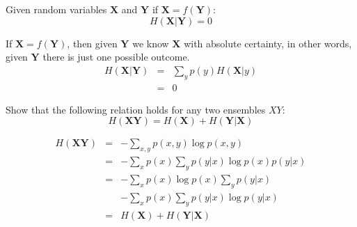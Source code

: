 \begin{exercise}
\label{lem:function}
Given random variables $\mathbf{X}$ and $\mathbf{Y}$ if $\mathbf{X}=f(\mathbf{Y})$: 
\begin{equation*}
H(\mathbf{X}|\mathbf{Y}) = 0
\end{equation*}
\end{exercise}
\begin{solution}
If $\mathbf{X}=f(\mathbf{Y})$, then given $\mathbf{Y}$ we know $\mathbf{X}$ with absolute certainty, in other words, given $\mathbf{Y}$ there is just one possible outcome.
\begin{eqnarray}
H(\mathbf{X}|\mathbf{Y})&=&\sum_{y}p(y) H(\mathbf{X}|y)\nonumber\\
         &=& 0
\end{eqnarray}
\end{solution}


\begin{exercise} Show that the following relation holds for any two ensembles $XY$:
\begin{equation*}
H(\mathbf{XY}) = H(\mathbf{X}) + H(\mathbf{Y}|\mathbf{X})
\end{equation*}
\end{exercise}
\begin{solution}
\begin{eqnarray}
H(\mathbf{XY}) &=& - \sum_{x,y} p(x,y)\log p(x,y) \nonumber \\
       &=& - \sum_{x}p(x)\sum_{y} p(y|x)\log p(x)p(y|x) \nonumber \\
       &=& - \sum_{x}p(x)\log p(x)\sum_{y} p(y|x) \nonumber \\
       & & - \sum_{x}p(x)\sum_{y} p(y|x)\log p(y|x) \nonumber \\
       &=& H(\mathbf{X}) + H(\mathbf{Y}|\mathbf{X})
\end{eqnarray}
\end{solution}

